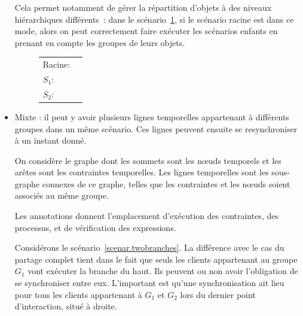 \documentclass{article}
\newcommand\trigger{point d'interaction\xspace}
\begin{document}
\begin{itemize}
    Cela permet notamment de gérer la répartition d'objets à des niveaux hiérarchiques différents~: dans le scénario~\ref{scenar.hierarchy}, si le scénario racine est dans ce mode, alors on peut correctement faire exécuter les scénarios enfants en prenant en compte les groupes de leurs objets. 
    
    \begin{figure}[h]
        \centering
        \begin{tabular}{L{3.5em}R{0.3\textwidth}}
            Racine: & \begin{tikzpicture}
            
            \end{tikzpicture} \\
            $S_1$: & \begin{tikzpicture}[scale=0.4, every node/.style={scale=0.6}]
            
            \end{tikzpicture} \\
            $S_2$: & \begin{tikzpicture}[scale=0.6, every node/.style={scale=0.6}]
            
            \end{tikzpicture} \\
        \end{tabular}
        \label{scenar.hierarchy}
    \end{figure}
    
    \item Mixte : il peut y avoir plusieurs lignes temporelles appartenant à différents groupes dans un même scénario. 
    Ces lignes peuvent ensuite se resynchroniser à un instant donné. 
    
    On considère le graphe dont les sommets sont les nœuds temporels et les arêtes sont les contraintes temporelles.
    Les lignes temporelles sont les sous-graphe connexes de ce graphe, telles que les contraintes et les nœuds soient associés au même groupe.
    
    Les annotations donnent l'emplacement d'exécution des contraintes, des processus, et de vérification des expressions. 
    
    Considérons le scénario~\ref{scenar.twobranches}. 
    La différence avec le cas du partage complet tient dans le fait que seuls les clients appartenant au groupe $G_1$ vont exécuter la branche du haut.
    Ils peuvent ou non avoir l'obligation de se synchroniser entre eux. 
    L'important est qu'une synchronisation ait lieu pour tous les clients appartenant à $G_1$ et $G_2$ lors du dernier \trigger, situé à droite.
    

\end{itemize}
\end{document}
